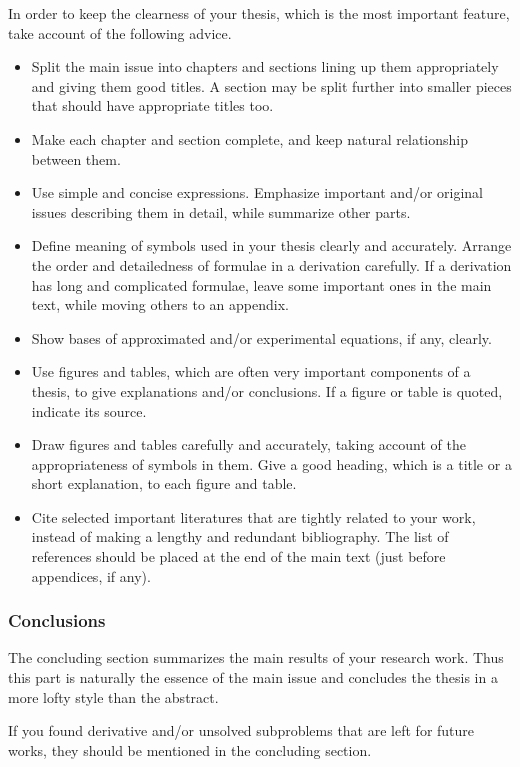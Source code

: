\documentclass[master,english]{kuisthesis}
\begin{document}
In order to keep the clearness of your thesis, which is the most important
feature, take account of the following advice.
\begin{itemize}%
\item
Split the main issue into chapters and sections lining up them appropriately
and giving them good titles.  A section may be split further into smaller
pieces that should have appropriate titles too.
\item
Make each chapter and section complete, and keep natural relationship
between them.
\item
Use simple and concise expressions.  Emphasize important and/or original
issues describing them in detail, while summarize other parts.
\item
Define meaning of symbols used in your thesis clearly and accurately.
Arrange the order and detailedness of formulae in a derivation carefully.
If a derivation has long and complicated formulae, leave some important ones
in the main text, while moving others to an appendix.
\item
Show bases of approximated and/or experimental equations, if any, clearly.
\item
Use figures and tables, which are often very important components of a
thesis, to give explanations and/or conclusions.  If a figure or table is
quoted, indicate its source.
\item
Draw figures and tables carefully and accurately, taking account of the
appropriateness of symbols in them.  Give a good heading, which is a title
or a short explanation, to each figure and table.
\item
Cite selected important literatures that are tightly related to your work,
instead of making a lengthy and redundant bibliography.  The list of
references should be placed at the end of the main text (just before
appendices, if any).
\end{itemize}%

\subsubsection{Conclusions}\label{subsubsec-conclusion}
The concluding section summarizes the main results of your research work.
Thus this part is naturally the essence of the main issue and concludes the
thesis in a more lofty style than the abstract.

If you found derivative and/or unsolved subproblems that are left for
future works, they should be mentioned in the concluding section.
\end{document}
